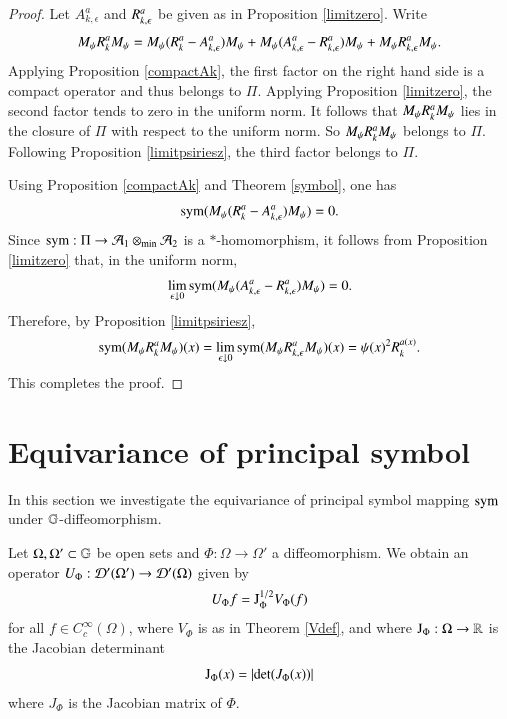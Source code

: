 \documentclass[leqno]{amsart}
\begin{document}
	
	\begin{proof}
		Let $A^{a}_{k,\epsilon}$ and ${ R}^{a}_{k,\epsilon}$ be given as in Proposition \ref{limitzero}.
		Write
		\begin{align*}
			M_{\psi}{ R}^{a}_{k}M_{\psi}=M_{\psi}({ R}^{a}_{k}-A^{a}_{k,\epsilon})M_{\psi}
			+M_{\psi}(A^{a}_{k,\epsilon}-{ R}^{a}_{k,\epsilon})M_{\psi}
			+M_{\psi}{ R}^{a}_{k,\epsilon}M_{\psi}.
		\end{align*}
		Applying Proposition \ref{compactAk}, the first factor on the right hand side is a compact operator and thus belongs to $\Pi$. 
		Applying Proposition \ref{limitzero}, the second factor tends to zero in the uniform norm. 
		It follows that $M_{\psi}{ R}^{a}_{k}M_{\psi}$ lies in the closure of $\Pi$ with respect to the uniform norm. So $M_{\psi}{ R}^{a}_{k}M_{\psi}$ belongs to $\Pi$.
		Following Proposition \ref{limitpsiriesz}, the third factor belongs to $\Pi$. 
		
		Using Proposition \ref{compactAk} and Theorem \ref{symbol}, one has
		\begin{align*}
			{\rm sym}(M_{\psi}({ R}^{a}_{k}-A^{a}_{k,\epsilon})M_{\psi})=0.
		\end{align*}
		Since ${\rm sym}:\Pi\rightarrow{\mathcal A}_{1}\otimes_{\rm min}{\mathcal A}_{2}$ is a $*$-homomorphism, it follows from Proposition \ref{limitzero} that, in the uniform norm,
		\begin{align*}
			\lim_{\epsilon\downarrow 0}{\rm sym}(M_{\psi}(A^{a}_{k,\epsilon}-{ R}^{a}_{k,\epsilon})M_{\psi})=0.
		\end{align*}  
		Therefore, by Proposition \ref{limitpsiriesz},
		\begin{align*}
			{\rm sym}(M_{\psi}{ R}^{a}_{k}M_{\psi})(x)=\lim_{\epsilon\downarrow 0}{\rm sym}(M_{\psi}{ R}^{a}_{k,\epsilon}M_{\psi})(x)
			=\psi(x)^{2} { R}^{a(x)}_{k}.
		\end{align*}
		This completes the proof.
	\end{proof}
	
	
	
	
	
	
	
	
	
	
	
	
	\section{Equivariance of principal symbol}\label{Equivariance-of-PS}
	In this section we investigate the equivariance of principal symbol mapping ${\rm sym}$ under $\mathbb{G}$-diffeomorphism.
	\begin{definition}
		Let $\Omega,\Omega'\subset\mathbb{G}$ be open sets and $\Phi:\Omega\to\Omega'$ a diffeomorphism. We obtain an operator $U_{\Phi}:{\mathcal D}'(\Omega')\to{\mathcal D}'(\Omega)$ given by
		\begin{align*}
			U_{\Phi}f=\mathrm J_{\Phi}^{1/2}V_\Phi(f)
		\end{align*}
		for all $f\in C^\infty_c(\Omega)$, where $V_\Phi$ is as in Theorem \ref{Vdef}, and where $\mathrm J_{\Phi}:\Omega\to\mathbb{R}$ is the Jacobian determinant
		$$\mathrm J_{\Phi}(x)=\lvert\det(J_\Phi(x))\rvert$$
		where $J_\Phi$ is the Jacobian matrix of $\Phi$.
	\end{definition}
	
\end{document}
